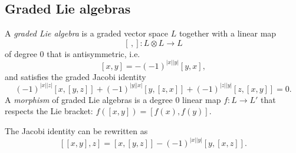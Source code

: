 \documentclass[english,no-theorem-numbers]{short-notes}
\newcommand\degree[1]{|#1|}
\begin{document}
\subsection{Graded Lie algebras}

A \emph{graded Lie algebra} is a graded vector space $L$ together with a linear map
\[
[\,,]\colon L \otimes L → L
\]
of degree $0$ that is antisymmetric, i.e.
\[
[x,y] = -(-1)^{\degree x \degree y}[y,x],
\]
and satisfies the graded Jacobi identity
\[
(-1)^{\degree x\degree z} [x,[y,z]] +
(-1)^{\degree y\degree x} [y,[z,x]] +
(-1)^{\degree z\degree y} [z,[x,y]] = 0.
\]
A \emph{morphism} of graded Lie algebras is a degree $0$ linear map $f\colon L → L'$ that respects the Lie bracket: $f([x,y]) = [f(x),f(y)]$.

The Jacobi identity can be rewritten as
\[
[ [x,y],z] = [x,[y,z]] - (-1)^{\degree x \degree y}[y,[x,z]].
\]
\end{document}
